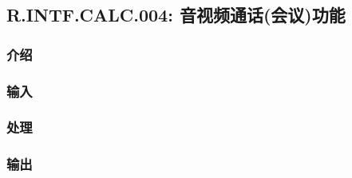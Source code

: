 \subsection{R.INTF.CALC.004: 音视频通话(会议)功能}
\subsubsection{介绍}
\subsubsection{输入}
\subsubsection{处理}
\subsubsection{输出}